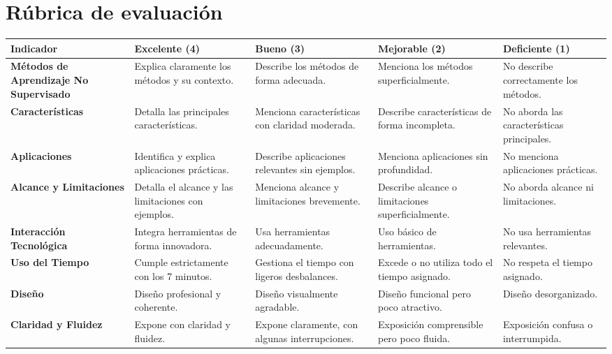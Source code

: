 \documentclass[a4,11pt]{aleph-notas}
\begin{document}
\section{Rúbrica de evaluación}



\begin{center}\small
\begin{tabular}{L{3cm}*{4}{L{2.8cm}}}
\toprule
\textbf{Indicador} & \textbf{Excelente (4)} & \textbf{Bueno (3)} & \textbf{Mejorable (2)} & \textbf{Deficiente (1)} \\ \midrule
\textbf{Métodos de Aprendizaje No Supervisado} & Explica claramente los métodos y su contexto. & Describe los métodos de forma adecuada. & Menciona los métodos superficialmente. & No describe correctamente los métodos. \\ \midrule
\textbf{Características} & Detalla las principales características. & Menciona características con claridad moderada. & Describe características de forma incompleta. & No aborda las características principales. \\ \midrule
\textbf{Aplicaciones} & Identifica y explica aplicaciones prácticas. & Describe aplicaciones relevantes sin ejemplos. & Menciona aplicaciones sin profundidad. & No menciona aplicaciones prácticas. \\ \midrule
\textbf{Alcance y Limitaciones} & Detalla el alcance y las limitaciones con ejemplos. & Menciona alcance y limitaciones brevemente. & Describe alcance o limitaciones superficialmente. & No aborda alcance ni limitaciones. \\ \midrule
\textbf{Interacción Tecnológica} & Integra herramientas de forma innovadora. & Usa herramientas adecuadamente. & Uso básico de herramientas. & No usa herramientas relevantes. \\ \midrule
\textbf{Uso del Tiempo} & Cumple estrictamente con los 7 minutos. & Gestiona el tiempo con ligeros desbalances. & Excede o no utiliza todo el tiempo asignado. & No respeta el tiempo asignado. \\ \midrule
\textbf{Diseño} & Diseño profesional y coherente. & Diseño visualmente agradable. & Diseño funcional pero poco atractivo. & Diseño desorganizado. \\ \midrule
\textbf{Claridad y Fluidez} & Expone con claridad y fluidez. & Expone claramente, con algunas interrupciones. & Exposición comprensible pero poco fluida. & Exposición confusa o interrumpida. \\ \bottomrule
\end{tabular}
\end{center}
\end{document}
